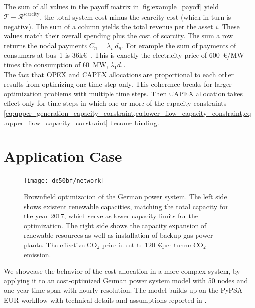 \documentclass[11pt,twocolumn]{article}
\newcommand{\kk}{k\euro~}
\newcommand{\totalcost}{\mathcal{T}}
\newcommand{\remainingcost}{\mathcal{R}}
\newcommand{\scarcitycost}{\remainingcost^\text{scarcity}}
\begin{document}
% 
The sum of all values in the payoff matrix in \cref{fig:example_payoff} yield $\totalcost - \scarcitycost$, the total system cost minus the scarcity cost (which in turn is negative).
The sum of a column  yields the total revenue per the asset $i$. These values match their overall spending plus the cost of scarcity. The sum a row returns the nodal payments $C_n = \lambda_n \, d_n$. For example the sum of payments of consumers at bus~1 is 36\kk. This is exactly the electricity price of 600~\euro/MW times the consumption of 60~MW, $\lambda_1 d_1$. \\
% 

The fact that OPEX and CAPEX allocations are proportional to each other results from optimizing one time step only. This coherence breaks for larger optimization problems with multiple time steps. Then CAPEX allocation takes effect only for time steps in which one or more of the capacity constraints  \cref{eq:upper_generation_capacity_constraint,eq:lower_flow_capacity_constraint,eq:upper_flow_capacity_constraint} become binding.  \\



\section{Application Case}
\label{sec:application_case}
% 
\begin{figure}[t]
    \centering
    \texttt{[image: de50bf/network]}
    \caption{Brownfield optimization of the German power system. The left side shows existent renewable capacities, matching the total capacity for the year 2017, which serve as lower capacity limits for the optimization. The right side shows the capacity expansion of renewable resources as well as installation of backup gas power plants. The effective CO$_2$ price is set to 120 \euro per tonne CO$_2$ emission.}
    \label{fig:network}
\end{figure}
% 
We showcase the behavior of the cost allocation in a more complex system, by applying it to an cost-optimized German power system model with 50 nodes and one year time span with hourly resolution. The model builds up on the PyPSA-EUR workflow \cite{horsch_jonas_pypsa-eur_2020} with technical details and assumptions reported in \cite{horsch_pypsa-eur_2018}. 
\end{document}
